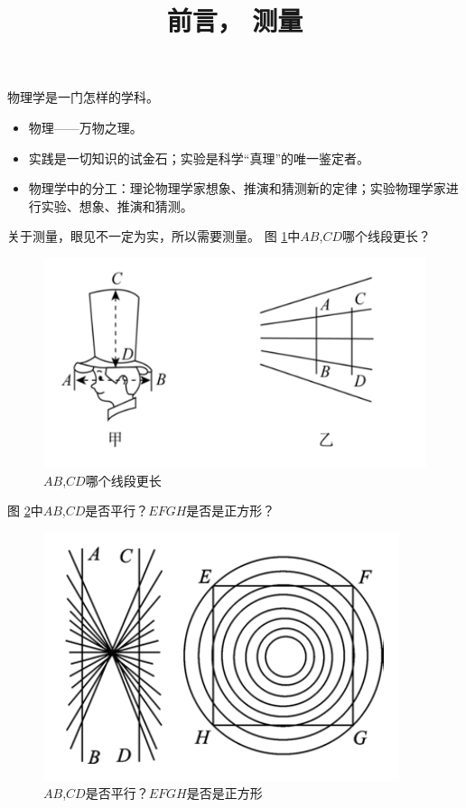 \documentclass[windows,csize4]{BHCexam}
\title{前言， 测量}
\begin{document}
\maketitle

\begin{groups}
    物理学是一门怎样的学科。
    \begin{itemize}
        \item 物理——万物之理。
        \item 实践是一切知识的试金石；实验是科学“真理”的唯一鉴定者。
        \item 物理学中的分工：理论物理学家想象、推演和猜测新的定律；实验物理学家进行实验、想象、推演和猜测。
    \end{itemize}
    
    关于测量，眼见不一定为实，所以需要测量。
    图 \ref{fig:fig_1_1}中$AB$,$CD$哪个线段更长？
    \begin{figure}[htb]
        \centering
        \includegraphics [scale=0.75,trim=0 0 0 0]{./image/fig_1_1.PNG}
        \caption{$AB$,$CD$哪个线段更长} 
        \label{fig:fig_1_1}
    \end{figure}

    图 \ref{fig:fig_1_2}中$AB$,$CD$是否平行？$EFGH$是否是正方形？
    \begin{figure}[htb]
        \centering
        \includegraphics [scale=0.75,trim=0 0 0 0]{./image/fig_1_2.PNG}
        \caption{$AB$,$CD$是否平行？$EFGH$是否是正方形} 
        \label{fig:fig_1_2}
    \end{figure}


\end{groups}
\end{document}
